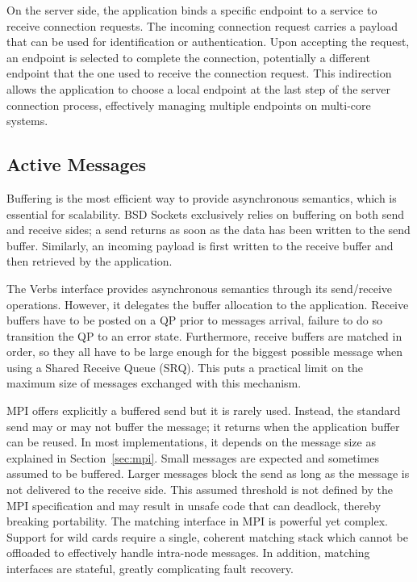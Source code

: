 On the server side, the application binds a specific endpoint to a service to receive connection requests. The incoming connection request carries a payload that can be used for identification or authentication. Upon accepting the request, an endpoint is selected to complete the connection, potentially a different endpoint that the one used to receive the connection request. This indirection allows the application to choose a local endpoint at the last step of the server connection process, effectively managing multiple endpoints on multi-core systems.

\subsection{Active Messages}
Buffering is the most efficient way to provide asynchronous semantics, which 
is essential for scalability. BSD Sockets exclusively relies on buffering on both 
send and receive sides; a send returns as soon as the data has been 
written to the send buffer. Similarly, an incoming payload is first 
written to the receive buffer and then retrieved by the application.

The Verbs interface provides asynchronous semantics through its send/receive
operations. However, it delegates the buffer allocation to the application. 
Receive buffers have to be posted on a QP prior to messages arrival, failure to do so transition the QP to an error state. Furthermore, receive buffers are matched in order, so they all have to be large enough for the 
biggest possible message when using a Shared Receive Queue (SRQ). 
This puts a practical limit on the maximum size of messages exchanged with 
this mechanism.

MPI offers explicitly a buffered send but it is rarely used. Instead, the 
standard send may or may not buffer the message; it returns when 
the application buffer can be reused. In most implementations, it 
depends on the message size as explained in Section~\ref{sec:mpi}. 
Small messages are expected and sometimes assumed to be buffered. Larger 
messages block the send as long as the message is not delivered to the receive 
side. This assumed threshold is not defined by the MPI 
specification and may result in unsafe code that can deadlock, thereby breaking 
portability. 
The matching interface in MPI is powerful yet complex. Support 
for wild cards require a single, coherent matching stack which cannot be 
offloaded to effectively handle intra-node messages. In addition, matching 
interfaces are stateful,  greatly complicating fault recovery.

